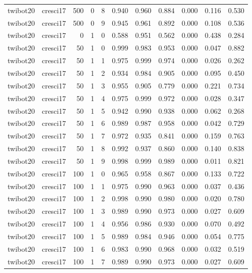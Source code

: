\begin{tabular}{llrrrrrrrrr}
twibot20 & cresci17 & 500 & 0 & 8 & 0.940 & 0.960 & 0.884 & 0.000 & 0.116 & 0.530 \\
twibot20 & cresci17 & 500 & 0 & 9 & 0.945 & 0.961 & 0.892 & 0.000 & 0.108 & 0.536 \\
twibot20 & cresci17 & 0 & 1 & 0 & 0.588 & 0.951 & 0.562 & 0.000 & 0.438 & 0.284 \\
twibot20 & cresci17 & 50 & 1 & 0 & 0.999 & 0.983 & 0.953 & 0.000 & 0.047 & 0.882 \\
twibot20 & cresci17 & 50 & 1 & 1 & 0.975 & 0.999 & 0.974 & 0.000 & 0.026 & 0.262 \\
twibot20 & cresci17 & 50 & 1 & 2 & 0.934 & 0.984 & 0.905 & 0.000 & 0.095 & 0.450 \\
twibot20 & cresci17 & 50 & 1 & 3 & 0.955 & 0.905 & 0.779 & 0.000 & 0.221 & 0.734 \\
twibot20 & cresci17 & 50 & 1 & 4 & 0.975 & 0.999 & 0.972 & 0.000 & 0.028 & 0.347 \\
twibot20 & cresci17 & 50 & 1 & 5 & 0.942 & 0.990 & 0.938 & 0.000 & 0.062 & 0.268 \\
twibot20 & cresci17 & 50 & 1 & 6 & 0.989 & 0.987 & 0.958 & 0.000 & 0.042 & 0.729 \\
twibot20 & cresci17 & 50 & 1 & 7 & 0.972 & 0.935 & 0.841 & 0.000 & 0.159 & 0.763 \\
twibot20 & cresci17 & 50 & 1 & 8 & 0.992 & 0.937 & 0.860 & 0.000 & 0.140 & 0.838 \\
twibot20 & cresci17 & 50 & 1 & 9 & 0.998 & 0.999 & 0.989 & 0.000 & 0.011 & 0.821 \\
twibot20 & cresci17 & 100 & 1 & 0 & 0.965 & 0.958 & 0.867 & 0.000 & 0.133 & 0.722 \\
twibot20 & cresci17 & 100 & 1 & 1 & 0.975 & 0.990 & 0.963 & 0.000 & 0.037 & 0.436 \\
twibot20 & cresci17 & 100 & 1 & 2 & 0.998 & 0.990 & 0.980 & 0.000 & 0.020 & 0.780 \\
twibot20 & cresci17 & 100 & 1 & 3 & 0.989 & 0.990 & 0.973 & 0.000 & 0.027 & 0.609 \\
twibot20 & cresci17 & 100 & 1 & 4 & 0.956 & 0.986 & 0.930 & 0.000 & 0.070 & 0.492 \\
twibot20 & cresci17 & 100 & 1 & 5 & 0.989 & 0.984 & 0.946 & 0.000 & 0.054 & 0.775 \\
twibot20 & cresci17 & 100 & 1 & 6 & 0.983 & 0.990 & 0.968 & 0.000 & 0.032 & 0.519 \\
twibot20 & cresci17 & 100 & 1 & 7 & 0.989 & 0.990 & 0.973 & 0.000 & 0.027 & 0.609 \\

\end{tabular}
